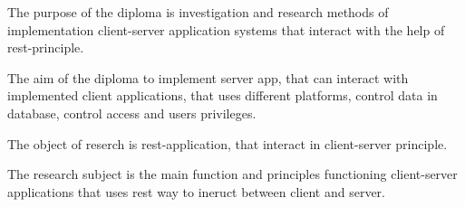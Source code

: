 The purpose of the diploma is investigation and research methods of implementation client-server application systems that interact with the help of rest-principle.

The aim of the diploma to implement server app, that can interact with implemented client applications, that uses different platforms, control data in database, control access and users privileges.

The object of reserch is rest-application, that interact in client-server principle.

The research subject is the main function and principles functioning client-server applications that uses rest way to ineruct between client and server.